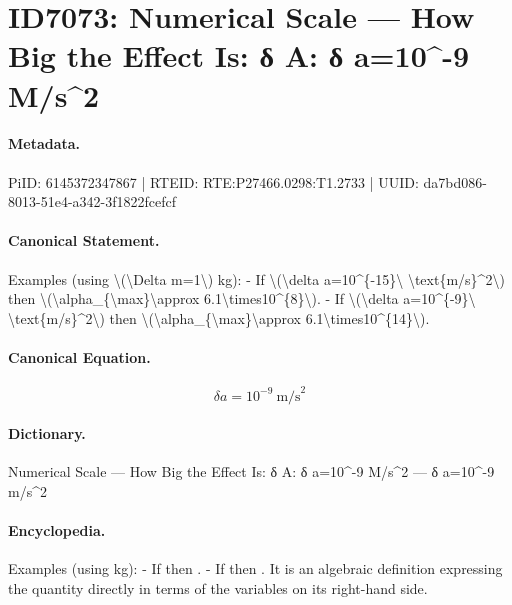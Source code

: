 \section*{ID7073: Numerical Scale — How Big the Effect Is: δ A: δ a=10\textasciicircum{}-9 M/s\textasciicircum{}2}
\paragraph{Metadata.}
PiID: 6145372347867 | RTEID: RTE:P27466.0298:T1.2733 | UUID: da7bd086-8013-51e4-a342-3f1822fcefcf

\paragraph{Canonical Statement.}
Examples (using \textbackslash{}(\textbackslash{}Delta m=1\textbackslash{}) kg): - If \textbackslash{}(\textbackslash{}delta a=10\textasciicircum{}\{-15\}\textbackslash{} \textbackslash{}text\{m/s\}\textasciicircum{}2\textbackslash{}) then \textbackslash{}(\textbackslash{}alpha\_\{\textbackslash{}max\}\textbackslash{}approx 6.1\textbackslash{}times10\textasciicircum{}\{8\}\textbackslash{}). - If \textbackslash{}(\textbackslash{}delta a=10\textasciicircum{}\{-9\}\textbackslash{} \textbackslash{}text\{m/s\}\textasciicircum{}2\textbackslash{}) then \textbackslash{}(\textbackslash{}alpha\_\{\textbackslash{}max\}\textbackslash{}approx 6.1\textbackslash{}times10\textasciicircum{}\{14\}\textbackslash{}).

\paragraph{Canonical Equation.}
\[
\delta a=10^{-9}\ \text{m/s}^2
\]

\paragraph{Dictionary.}
Numerical Scale — How Big the Effect Is: δ A: δ a=10\textasciicircum{}-9 M/s\textasciicircum{}2 — δ a=10\textasciicircum{}-9 m/s\textasciicircum{}2

\paragraph{Encyclopedia.}
Examples (using kg): - If then . - If then . It is an algebraic definition expressing the quantity directly in terms of the variables on its right-hand side.
